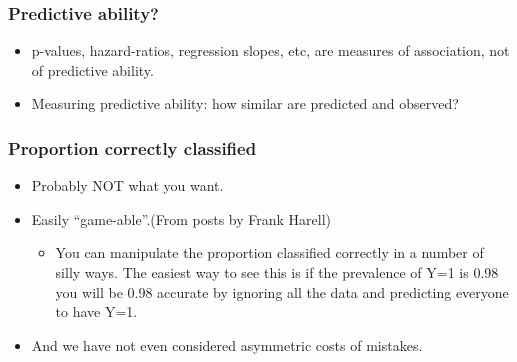 \begin{frame}
\frametitle{Predictive ability?}
\begin{itemize}
\item p-values, hazard-ratios, regression slopes, etc, are measures of
  association, not of predictive ability.
\vspace*{20pt}

\item Measuring predictive ability: how similar are predicted and observed?

\end{itemize}
\end{frame}



\begin{frame}
  \frametitle{Proportion correctly classified}
  \begin{itemize}
  \item Probably NOT what you want.
  \item Easily ``game-able''.(From posts by Frank Harell)
    \begin{itemize}
  \item You can manipulate the proportion classified correctly in a number
    of silly ways. The easiest way to see this is if the prevalence of Y=1
    is 0.98 you will be 0.98 accurate by ignoring all the data and
    predicting everyone to have Y=1.
    \end{itemize}
  \item And we have not even considered asymmetric costs of mistakes.
  \end{itemize}
\end{frame}


